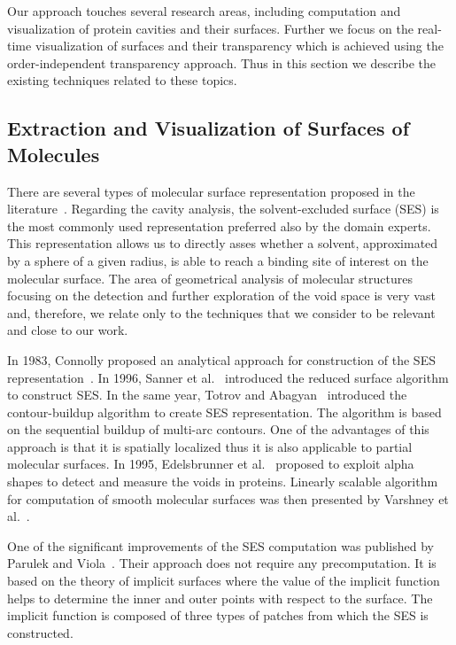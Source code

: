 Our approach touches several research areas, including computation and visualization of protein cavities and their surfaces. 
Further we focus on the real-time visualization of surfaces and their transparency which is achieved using the order-independent transparency approach. 
Thus in this section we describe the existing techniques related to these topics.

\subsection{Extraction and Visualization of Surfaces of Molecules}
There are several types of molecular surface representation proposed in the literature~\cite{STAR2015}. 
Regarding the cavity analysis, the solvent-excluded surface (SES) is the most commonly used representation preferred also by the domain experts.%
This representation allows us to directly asses whether a solvent, approximated by a sphere of a given radius, is able to reach a binding site of interest on the molecular surface. The area of geometrical analysis of molecular structures focusing on the detection and further exploration of the void space is very vast and, therefore, we relate only to the techniques that we consider to be relevant and close to our work. 

In 1983, Connolly proposed an analytical approach for construction of the SES representation~\cite{connolly1983analytical}.
In 1996, Sanner et al.~\cite{Sanner1996} introduced the reduced surface algorithm to construct SES. In the same year, Totrov and Abagyan~\cite{totrov1996contour} introduced the contour-buildup algorithm to create SES representation. The algorithm is based on the sequential buildup of multi-arc contours. 
One of the advantages of this approach is that it is spatially localized thus it is also applicable to partial molecular surfaces.
In 1995, Edelsbrunner et al.~\cite{Edelsbrunner1995} proposed to exploit alpha shapes to detect and measure the voids in proteins.
Linearly scalable algorithm for computation of smooth molecular surfaces was then presented by Varshney et al.~\cite{Varshney1994}.

One of the significant improvements of the SES computation was published by Parulek and Viola~\cite{parulek2012implicit}.
Their approach does not require any precomputation. 
It is based on the theory of implicit surfaces where the value of the implicit function helps to determine the inner and outer points with respect to the surface.
The implicit function is composed of three types of patches from which the SES is constructed.


